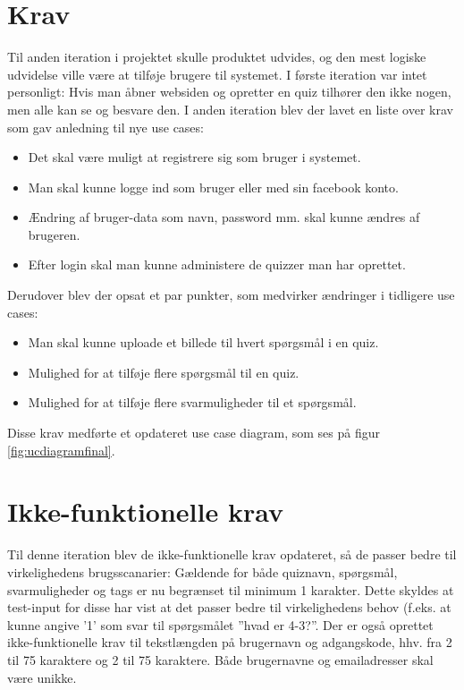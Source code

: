 \section{Krav}
Til anden iteration i projektet skulle produktet udvides, og den mest logiske udvidelse ville være at tilføje brugere til systemet. I første iteration var intet personligt: Hvis man åbner websiden og opretter en quiz tilhører den ikke nogen, men alle kan se og besvare den.
I anden iteration blev der lavet en liste over krav som gav anledning til nye use cases:
\begin{itemize}
\item Det skal være muligt at registrere sig som bruger i systemet.
\item Man skal kunne logge ind som bruger eller med sin facebook konto.
\item Ændring af bruger-data som navn, password mm. skal kunne ændres af brugeren.
\item Efter login skal man kunne administere de quizzer man har oprettet.
\end{itemize}

Derudover blev der opsat et par punkter, som medvirker ændringer i tidligere use cases:
\begin{itemize}
\item Man skal kunne uploade et billede til hvert spørgsmål i en quiz.
\item Mulighed for at tilføje flere spørgsmål til en quiz.
\item Mulighed for at tilføje flere svarmuligheder til et spørgsmål.
\end{itemize}

Disse krav medførte et opdateret use case diagram, som ses på figur \ref{fig:ucdiagramfinal}.



\section{Ikke-funktionelle krav}
Til denne iteration blev de ikke-funktionelle krav opdateret, så de passer bedre til virkelighedens brugsscanarier:
Gældende for både quiznavn, spørgsmål, svarmuligheder og tags er nu begrænset til minimum 1 karakter. Dette skyldes at test-input for disse har vist at det passer bedre til virkelighedens behov (f.eks. at kunne angive '1' som svar til spørgsmålet ''hvad er 4-3?''.
Der er også oprettet ikke-funktionelle krav til tekstlængden på brugernavn og adgangskode, hhv. fra 2 til 75 karaktere og 2 til 75 karaktere. 
Både brugernavne og emailadresser skal være unikke.
